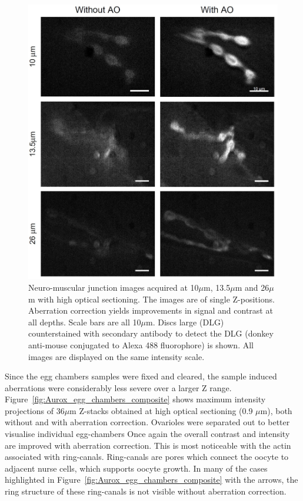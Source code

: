 \begin{figure}[h]
	\centering
	\includegraphics[width=\textwidth]{images/Aurox_depth_comparison_composite.jpg}
	\caption[Depth comparison of the Aurox imaging system]{Neuro-muscular 
		junction images acquired at 10$\mu$m, 13.5$\mu$m and 26$\mu$m with 
		high optical sectioning. The images are of single Z-positions. 
		Aberration correction yields improvements in signal and contrast 
		at all depths. Scale bars are all 10$\mu$m. Discs large (DLG) 
		counterstained with secondary antibody to detect the DLG (donkey 
		anti-mouse conjugated to Alexa 488 fluorophore) is shown. 
		All images are displayed on the same intensity scale.}
	\label{fig:Aurox_depth_comparison_composite}
\end{figure}

Since the egg chambers samples were fixed and cleared, the sample induced 
aberrations were considerably less severe over a larger Z range. 
Figure~\ref{fig:Aurox_egg_chambers_composite} shows maximum intensity 
projections of 36$\mu$m Z-stacks obtained at high optical sectioning (0.9 $\mu$m), both
without and with aberration correction. Ovarioles were separated out to 
better visualise individual egg-chambers Once again the overall contrast 
and intensity are improved with aberration correction. This is most 
noticeable with the actin associated with ring-canals. Ring-canals are pores 
which connect the oocyte to adjacent nurse cells, which supports oocyte 
growth\cite{loyer2015drosophila}. In many of the cases highlighted in 
Figure~\ref{fig:Aurox_egg_chambers_composite} with the arrows, the ring 
structure of these ring-canals is not visible without aberration correction.

